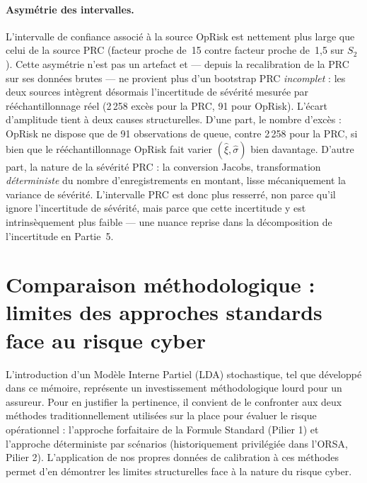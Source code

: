 \documentclass[11pt,a4paper]{article}
\theoremstyle{navystyle}
\theoremstyle{navydef}
\begin{document}
\paragraph{Asymétrie des intervalles.} L'intervalle de confiance associé à la
source OpRisk est nettement plus large que celui de la source PRC (facteur
proche de~15 contre facteur proche de~1{,}5 sur $S_2$). Cette asymétrie
n'est pas un artefact et --- depuis la recalibration de la PRC sur ses
données brutes --- ne provient plus d'un bootstrap PRC \emph{incomplet} : les
deux sources intègrent désormais l'incertitude de sévérité mesurée par
rééchantillonnage réel (2\,258 excès pour la PRC, 91 pour OpRisk). L'écart
d'amplitude tient à deux causes structurelles. D'une part, le nombre d'excès :
OpRisk ne dispose que de 91 observations de queue, contre 2\,258 pour la PRC,
si bien que le rééchantillonnage OpRisk fait varier $(\hat\xi, \hat\sigma)$
bien davantage. D'autre part, la nature de la sévérité PRC : la conversion
Jacobs, transformation \emph{déterministe} du nombre d'enregistrements en
montant, lisse mécaniquement la variance de sévérité. L'intervalle PRC est
donc plus resserré, non parce qu'il ignore l'incertitude de sévérité, mais
parce que cette incertitude y est intrinsèquement plus faible --- une nuance
reprise dans la décomposition de l'incertitude en Partie~5.

\vspace{1em}

\section*{Comparaison méthodologique : limites des approches standards face au risque cyber}

L'introduction d'un Modèle Interne Partiel (LDA) stochastique, tel que développé dans ce mémoire, représente un investissement méthodologique lourd pour un assureur. Pour en justifier la pertinence, il convient de le confronter aux deux méthodes traditionnellement utilisées sur la place pour évaluer le risque opérationnel : l'approche forfaitaire de la Formule Standard (Pilier 1) et l'approche déterministe par scénarios (historiquement privilégiée dans l'ORSA, Pilier 2). L'application de nos propres données de calibration à ces méthodes permet d'en démontrer les limites structurelles face à la nature du risque cyber.
\end{document}
